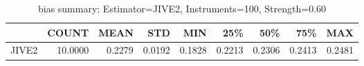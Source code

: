 \begin{table}[ht]
\centering
\caption{bias summary: Estimator=JIVE2, Instruments=100, Strength=0.60}
\begin{tabular}{lrrrrrrrr}
\toprule
 & COUNT & MEAN & STD & MIN & 25\% & 50\% & 75\% & MAX \\
\midrule
JIVE2 & 10.0000 & 0.2279 & 0.0192 & 0.1828 & 0.2213 & 0.2306 & 0.2413 & 0.2481 \\
\bottomrule
\end{tabular}
\end{table}

